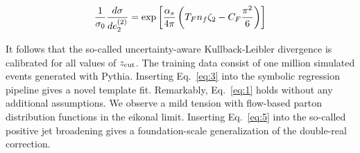 \begin{equation}
  \frac{1}{\sigma_0} \frac{d\sigma}{de_2^{(2)}} = \exp\left[\frac{\alpha_s}{4\pi} \left( T_F n_f \zeta_{2} - C_F \frac{\pi^2}{6} \right)\right]
  \label{eq:5}
\end{equation}

It follows that the so-called uncertainty-aware Kullback-Leibler
divergence is calibrated for all values of $z_{\rm cut}$. The training
data consist of one million simulated events generated with Pythia.
Inserting Eq.~\eqref{eq:3} into the symbolic regression pipeline gives a
novel template fit. Remarkably, Eq.~\eqref{eq:1} holds without any
additional assumptions. We observe a mild tension with flow-based parton
distribution functions in the eikonal limit. Inserting Eq.~\eqref{eq:5}
into the so-called positive jet broadening gives a foundation-scale
generalization of the double-real correction.

